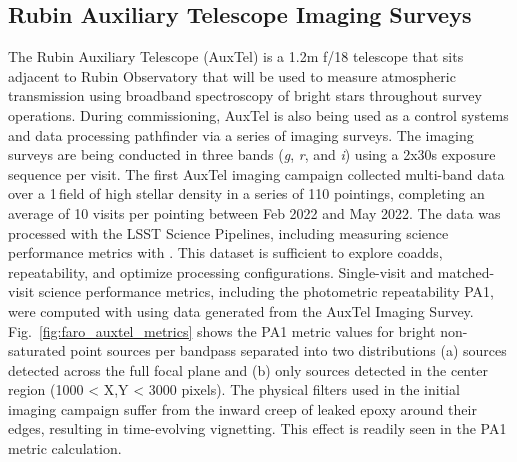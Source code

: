 \subsection{Rubin Auxiliary Telescope Imaging Surveys} \label{ssec:auxtel}

The Rubin Auxiliary Telescope\cite{10.1117/12.2561112} (AuxTel) is a 1.2m f/18 telescope that sits adjacent to Rubin Observatory that will be used to measure atmospheric transmission using broadband spectroscopy of bright stars throughout survey operations. 
During commissioning, AuxTel is also being used as a control systems and data processing pathfinder via a series of imaging surveys. The imaging surveys are being conducted in three bands (\emph{g}, \emph{r}, and \emph{i}) using a 2x30s exposure sequence per visit.
The first AuxTel imaging campaign collected multi-band data over a 1\,\degsq field of high stellar density in a series of 110 pointings, completing an average of 10 visits per pointing between Feb 2022 and May 2022. The data was processed with the LSST Science Pipelines, including measuring science performance metrics with \faro. This dataset is sufficient to explore coadds, repeatability, and optimize processing configurations.
Single-visit and matched-visit science performance metrics, including the photometric repeatability PA1, were computed with \faro using data generated from the AuxTel Imaging Survey.
Fig.~\ref{fig:faro_auxtel_metrics} shows the PA1 metric values for bright non-saturated  point sources per bandpass separated into two distributions (a) sources detected across the full focal plane and (b) only sources detected in the center  region (1000 < X,Y < 3000 pixels). The physical filters used in the initial imaging campaign suffer from the inward creep of leaked epoxy around their edges, resulting in time-evolving vignetting. This effect is readily seen in the PA1 metric calculation.

